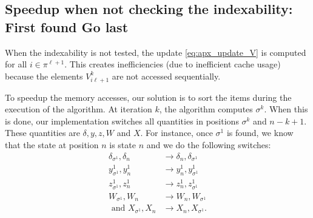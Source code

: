 \documentclass[acmsmall,screen,anonymous]{acmart}
\begin{document}
\subsection{Speedup when not checking the indexability: First found Go last} 

When the indexability is not tested, the update \eqref{eq:apx_update_V} is computed for all $i\in\pi^{\ell+1}$. This creates inefficiencies (due to  inefficient cache usage) because the elements $V^k_{i\ell+1}$ are not accessed sequentially.

To speedup the memory accesses, our solution is to sort the items during the execution of the algorithm. At iteration $k$, the algorithm computes $\sigma^{k}$. When this is done, our implementation switches all quantities in positions $\sigma^{k}$ and $n-k+1$. These quantities are $\delta, y, z, W$ and $X$. For instance, once $\sigma^1$ is found, we know that the state at position $n$ is state $n$ and we do the following switches:
\begin{align*}
    \delta_{\sigma^1}, \delta_{n} &\rightarrow \delta_{n}, \delta_{\sigma^1} \\
    y^1_{\sigma^1}, y^1_{n} &\rightarrow y^1_{n}, y^1_{\sigma^1} \\
    z^1_{\sigma^1}, z^1_{n} &\rightarrow z^1_{n}, z^1_{\sigma^1} \\
    W_{\sigma^1 }, W_{n } &\rightarrow W_{n}, W_{\sigma^1 } \\
    \text{ and } X_{\sigma^1 }, X_{n } &\rightarrow X_{n}, X_{\sigma^1 }.
\end{align*}
\end{document}
